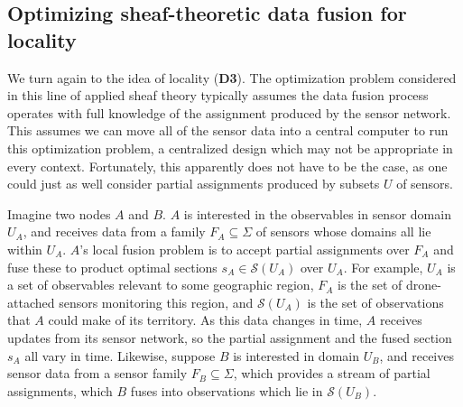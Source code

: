\subsection{Optimizing sheaf-theoretic data fusion for locality}

We turn again to the idea of locality (\textbf{D3}). The optimization problem considered in this line of applied sheaf theory typically assumes the data fusion process operates with full knowledge of the assignment produced by the sensor network. This assumes we can move all of the sensor data into a central computer to run this optimization problem, a centralized design which may not be appropriate in every context. Fortunately, this apparently does not have to be the case, as one could just as well consider partial assignments produced by subsets $U$ of sensors.

Imagine two nodes $A$ and $B$. $A$ is interested in the observables in sensor domain $U_A$, and receives data from a family $F_A \subseteq \Sigma$ of sensors whose domains all lie within $U_A$. $A$'s local fusion problem is to accept partial assignments over $F_A$ and fuse these to product optimal sections $s_A \in \mathcal{S}(U_A)$ over $U_A$. For example, $U_A$ is a set of observables relevant to some geographic region, $F_A$ is the set of drone-attached sensors monitoring this region, and $\mathcal{S}(U_A)$ is the set of observations that $A$ could make of its territory. As this data changes in time, $A$ receives updates from its sensor network, so the partial assignment and the fused section $s_A$ all vary in time. Likewise, suppose $B$ is interested in domain $U_B$, and receives sensor data from a sensor family $F_B \subseteq \Sigma$, which provides a stream of partial assignments, which $B$ fuses into observations which lie in $\mathcal{S}(U_B)$.

